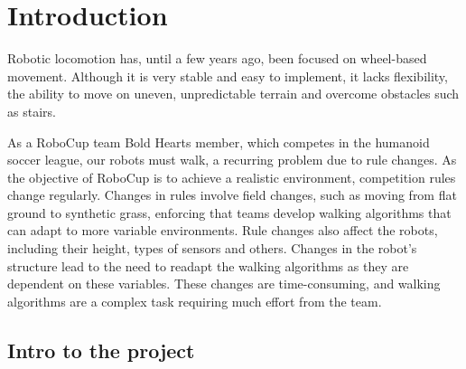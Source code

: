 \section{Introduction}
Robotic locomotion has, until a few years ago, been focused on wheel-based movement. 
Although it is very stable and easy to implement, it lacks flexibility, the ability to move on uneven, unpredictable terrain and overcome obstacles such as stairs.
\par As a RoboCup team Bold Hearts member, which competes in the humanoid soccer league, our robots must walk, a recurring problem due to rule changes. 
As the objective of RoboCup is to achieve a realistic environment, competition rules change regularly. 
Changes in rules involve field changes, such as moving from flat ground to synthetic grass, enforcing that teams develop walking algorithms that can adapt to more variable environments. 
Rule changes also affect the robots, including their height, types of sensors and others. 
Changes in the robot's structure lead to the need to readapt the walking algorithms as they are dependent on these variables. 
These changes are time-consuming, and walking algorithms are a complex task requiring much effort from the team.
\subsection{Intro to the project}